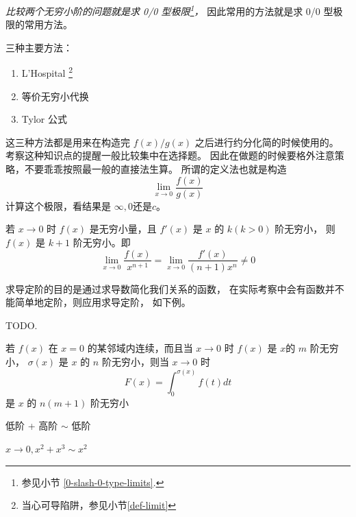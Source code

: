 \emph{比较两个无穷小阶的问题就是求 0/0 型极限\footnote{参见小节 \ref{0-slash-0-type-limits}.}，}
因此常用的方法就是求 0/0 型极限的常用方法。

三种主要方法：
\begin{enumerate}
    \item L'Hospital \footnote{当心可导陷阱，参见小节\ref{def-limit}}
	\item 等价无穷小代换
	\item Tylor 公式
\end{enumerate}

这三种方法都是用来在构造完 $f(x)/g(x)$ 之后进行约分化简的时候使用的。
考察这种知识点的提醒一般比较集中在选择题。
因此在做题的时候要格外注意策略，不要乖乖按照最一般的直接法生算。
所谓的定义法也就是构造
\[
    \lim_{x\to 0} \dfrac{f(x)}{g(x)}
\]
计算这个极限，看结果是 $\infty, 0$还是$c$。 

\begin{lemma}[L'Hospital求导定阶]
	若 $x \to 0$ 时 $f(x)$ 是无穷小量，且 $f'(x)$ 是 $x$ 的 $k(k>0)$ 阶无穷小，
	则 $f(x)$ 是 $k+1$ 阶无穷小。即
	\begin{equation}
		\lim_{x \to 0} \dfrac{f(x)}{x^{n+1}} = \lim_{x \to 0} \dfrac{f'(x)}{(n+1)x^{n}} \neq 0
	\end{equation}
\end{lemma}

求导定阶的目的是通过求导数简化我们关系的函数，
在实际考察中会有函数并不能简单地定阶，则应用求导定阶，
如下例。

\begin{example}
    TODO. %
\end{example}

\begin{lemma}
	若 $f(x)$ 在 $x=0$ 的某邻域内连续，而且当 $x\to0$ 时 $f(x)$ 是 $x$的 $m$ 阶无穷小，
	$\sigma(x)$ 是 $x$ 的 $n$ 阶无穷小，则当 $x\to0$ 时
	\begin{equation*}
		F(x) = \int_{0}^{\sigma(x)} f(t) dt
	\end{equation*}
	是 $x$ 的 $n(m+1)$ 阶无穷小
\end{lemma}

\begin{lemma}
	低阶 + 高阶 $\sim$ 低阶
	
	$x \to 0, x^2+x^3 \sim x^2$
\end{lemma}

